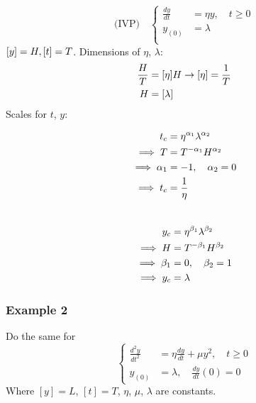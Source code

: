 \documentclass[12pt,twoside]{article}
\begin{document}
\begin{equation} \text{(IVP)}\quad
  \left\{
  \begin{aligned}
    \frac{dy}{dt} &= \eta y, \quad t\ge0 \\
    y_{(0)} &= \lambda \\
  \end{aligned} \right.
\end{equation}
$[y] = H , [t]=T$. Dimensions of $\eta$, $\lambda$:
\begin{equation}
  \begin{aligned}
    \frac{H}{T} &= [\eta]H \rightarrow [\eta]=\frac{1}{T} \\
    H &= [\lambda]
  \end{aligned}
\end{equation}
Scales for $t$, $y$:
\begin{multicols}{2}
  \begin{equation}
    \begin{aligned}
      t_c &= \eta^{\alpha_1} \lambda^{\alpha_2} \\
      \implies T &= T^{-\alpha_1}H^{\alpha_2} \\
      \implies \alpha_1 &= -1,\quad \alpha_2 = 0 \\
      \implies t_c &= \frac{1}{\eta}\\
    \end{aligned}
  \end{equation}
\\
  \begin{equation}
    \begin{aligned}
      y_c &= \eta^{\beta_1} \lambda^{\beta_2} \\
      \implies H &= T^{-\beta_1}H^{\beta_2} \\
      \implies \beta_1 &= 0,\quad \beta_2 = 1 \\
      \implies y_c &= \lambda
    \end{aligned}
  \end{equation}
\end{multicols}
\subsubsection{Example 2}

Do the same for
\begin{equation}
  \left\{
  \begin{aligned}
    \frac{d^2y}{dt^2} &= \eta \frac{dy}{dt} + \mu y^2,\quad t \ge 0 \\
    y_{(0)} &= \lambda, \quad \frac{dy}{dt}(0) = 0
  \end{aligned} \right.
\end{equation}
Where $[y]=L$, $[t]=T$, $\eta$, $\mu$, $\lambda$ are constants.
\end{document}
